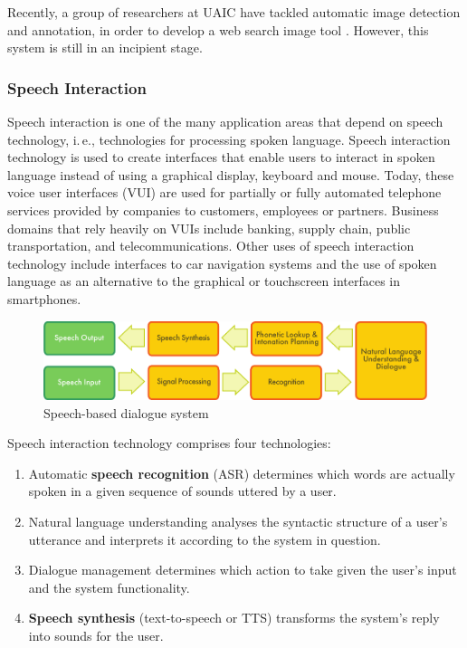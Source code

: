 \begin{multicols}{2}
Recently, a group of researchers at UAIC have tackled automatic image detection and annotation, in order to develop a web search image tool \cite{iftene}. However, this system is still in an incipient stage.

\subsubsection{Speech Interaction}

Speech interaction is one of the many application areas that depend on speech technology, i.\,e., technologies for processing spoken language. Speech interaction technology is used to create interfaces that enable users to interact in spoken language instead of using a graphical display, keyboard and mouse.  Today, these voice user interfaces (VUI) are used for partially or fully automated telephone services provided by companies to customers, employees or partners. Business domains that rely heavily on VUIs include banking, supply chain, public transportation, and telecommunications. Other uses of speech interaction technology include interfaces to car navigation systems and the use of spoken language as an alternative to the graphical or touchscreen interfaces in smartphones.

\begin{figure}[htb]
  \center
  \includegraphics[width=\textwidth]{../_media/english/simple_speech-based_dialogue_architecture}
  \caption{Speech-based dialogue system}
  \label{fig:dialoguearch_en}
  \vspace{-15mm}
\end{figure}

Speech interaction technology comprises four technologies: 

\begin{enumerate}
\item Automatic \textbf{speech recognition} (ASR) determines which words are actually spoken in a given sequence of sounds uttered by a user.  
\item Natural language understanding analyses the syntactic structure of a user’s utterance and interprets it according to the system in question.
\item Dialogue management determines which action to take given the user's input and the system functionality.   
\item \textbf{Speech synthesis} (text-to-speech or TTS) transforms the system’s reply into sounds for the user.
\end{enumerate}


\end{multicols}
